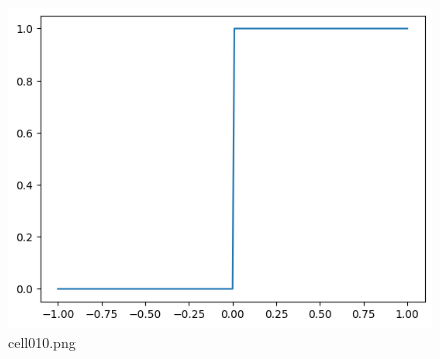 \begin{figure}[ht]
	\centering
	\includegraphics[scale=0.8, max width=\linewidth]{./fig/local-learning-rule/logistic-regression-perceptron/cell010.png}
	\caption{cell010.png}
	\label{cell010.png}
\end{figure}